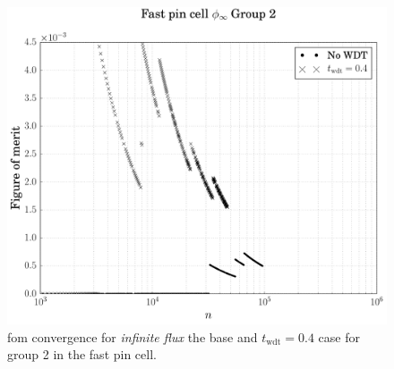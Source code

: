 \begin{figure}[hbtp]
  \centering
  \includegraphics[scale=0.5]{images/results/fast_inf_flx_example}
  \caption[\Acrshort{fom} convergence for \textit{infinite flux} for the base
  and $t_{\mathrm{wdt}} = 0.4$ case for group 2.]{\Acrshort{fom} convergence for
    \textit{infinite flux} the base and $t_{\mathrm{wdt}} = 0.4$ case for
    group 2 in the fast pin cell.}
  \label{fig:fast_inf_flx_example}
\end{figure}

